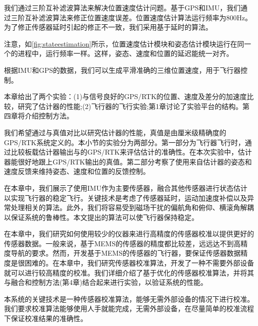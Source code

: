 \documentclass[
  type=master
]{gdutthesis}
\begin{document}
我们通过三阶互补滤波算法来解决位置速度估计问题。基于GPS和IMU，我们通过三阶互补滤波算法来修正位置速度误差。位置速度估计算法运行频率为800Hz。为了修正传感器延时引起的修正不一致，我们采用基于延时的算法\cite{khosravian2016state}。\par
注意，如\autoref{fig:stateestimation}所示，位置速度估计模块和姿态估计模块运行在同一个的进程中，运行频率一样。这样，姿态、速度和位置的延迟能统一对齐。

根据IMU和GPS的数据，我们可以生成平滑准确的三维位置速度，用于飞行器控制。

本章给出了两个实验：(1)与信号良好的GPS/RTK的位置、速度及差分的加速度比较，研究了估计器的性能;(2)飞行器的飞行实验;第1章讨论了实验平台的结构。第四章将介绍控制方法。

我们希望通过与真值对比以研究估计器的性能，真值是由厘米级精确度的GPS/RTK系统定义的。本小节的实验分为两部分。第一部分为飞行器飞行时，通过比较板载估计器输出与的GPS/RTK来评估估计的准确性。在本次实验中，估计器能很好地跟上GPS/RTK输出的真值。第二部分考察了使用来自估计器的姿态和速度反馈来维持姿态、速度和位置的反馈控制。


在本章中，我们展示了使用IMU作为主要传感器，融合其他传感器进行状态估计以实现飞行器的稳定飞行。关键技术是考虑了传感器延时，运动加速度补偿以及异常处理相关的算法。此外，我们将容易受到磁场干扰的偏航角和俯仰、横滚角解耦以保证系统的鲁棒性。本文提出的算法可以使飞行器保持稳定。

在本章中，我们研究如何使用较少的仪器来进行高精度的传感器校准以提供更好的传感器数据。一般来说，基于MEMS的传感器的精度都比较差，远远达不到高精度导航的要求。然而，开发基于MEMS的传感器的飞行器，要保证传感器数据精度是很困难的。在本章中，我们研究传感器校准算法，开发了一种不需要外部设备就可以进行较高精度的校准。我们详细介绍了基于优化的传感器校准算法，并将其与融合和控制方法(第4章)结合起来进行实验，以验证系统的性能。\par
本系统的关键技术是一种传感器校准算法，能够无需外部设备的情况下进行校准。我们要求校准算法能够使用人手就能完成，无需外部设备，在尽量简单的校准流程下保证校准结果的准确性。\par
\end{document}
